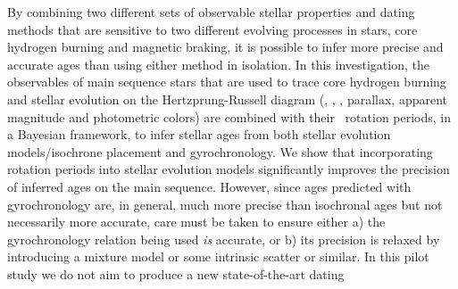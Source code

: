 

By combining two different sets of observable stellar properties and dating
methods that are sensitive to two different evolving processes in stars, core
hydrogen burning and magnetic braking, it is possible to infer more precise
and accurate ages than using either method in isolation.
In this investigation, the observables of main sequence stars that are used to
trace core hydrogen burning and stellar evolution on the Hertzprung-Russell
diagram (\teff, \feh, \logg, parallax, apparent magnitude and photometric
colors) are combined with their \kepler\ rotation periods, in a Bayesian
framework, to infer stellar ages from both stellar evolution models/isochrone
placement and gyrochronology.
We show that incorporating rotation periods into stellar evolution models
significantly improves the precision of inferred ages on the main sequence.
However, since ages predicted with gyrochronology are, in general, much more
precise than isochronal ages but not necessarily more accurate, care must be
taken to ensure either a) the gyrochronology relation being used {\it is}
accurate, or b) its precision is relaxed by introducing a mixture model or
some intrinsic scatter or similar.
In this pilot study we do not aim to produce a new state-of-the-art dating
